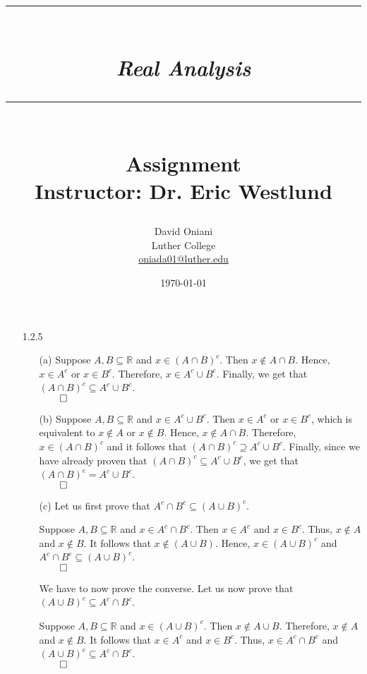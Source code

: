 \documentclass[11pt]{article}
\author{David Oniani\\
        Luther College\\
        \href{mailto:oniada01@luther.edu}{oniada01@luther.edu}}
\title{\rule{\paperwidth - 150pt}{1pt}\textbf{\\\textit{Real Analysis}\\}\rule
{\paperwidth - 150pt}{1pt}\\\textbf{Assignment \textnumero1}\\{\normalsize
Instructor: Dr. Eric Westlund}}
\date{\today}
\newcommand{\reals}{\mathbb{R}}
\begin{document}
\maketitle

%
%
%

\begin{itemize}
    \item[1.2.5]
    \begin{itemize}
        \item[(a)]
        Suppose $A, B \subseteq \reals$ and $x \in (A \cap B)^c$. Then $x
        \notin A \cap B$. Hence, $x \in A^c$ or $x \in B^c$. Therefore, $x \in
        A^c \cup B^c$. Finally, we get that $(A \cap B)^c \subseteq A^c \cup
        B^c$.\\
        $\qed$

        \item[(b)]
        Suppose $A, B \subseteq \reals$ and $x \in A^c \cup B^c$. Then $x
        \in A^c$ or $x \in B^c$, which is equivalent to $x \notin A$ or $x
        \notin B$. Hence, $x \notin A \cap B$. Therefore, $x \in (A \cap B)^c$
        and it follows that $(A \cap B)^c \supseteq A^c \cup B^c$. Finally,
        since we have already proven that $(A \cap B)^c \subseteq A^c \cup
        B^c$, we get that $(A \cap B)^c = A^c \cup B^c$.\\
        $\qed$

        \item[(c)]
        Let us first prove that $A^c \cap B^c \subseteq (A \cup B)^c$.

        Suppose $A, B \subseteq \reals$ and $x \in A^c \cap B^c$. Then $x
        \in A^c$ and $x \in B^c$. Thus, $x \notin A$ and $x \notin B$. It
        follows that $x \notin (A \cup B)$. Hence, $x \in (A \cup B)^c$ and
        $A^c \cap B^c \subseteq (A \cup B)^c$.\\
        $\qed$

        We have to now prove the converse. Let us now prove that $(A \cup B)^c
        \subseteq A^c \cap B^c$.

        Suppose $A, B \subseteq \reals$ and $x \in (A \cup B)^c$. Then $x
        \notin A \cup B$. Therefore, $x \notin A$ and $x \notin B$. It follows
        that $x \in A^c$ and $x \in B^c$. Thus, $x \in A^c \cap B^c$ and $(A
        \cup B)^c \subseteq A^c \cap B^c$.\\
        $\qed$


\end{itemize}
\end{itemize}
\end{document}
